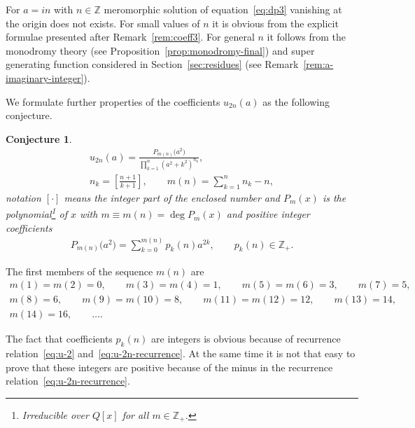 \documentclass[pdftex]{sigma}
\numberwithin{equation}{section}
\newtheorem{Conjecture}[Theorem]{Conjecture}
\begin{document}
\begin{Remark}\label{rem:a-imaginary-integer-final}
For $a=in$ with $n\in\mathbb Z$ meromorphic solution of equation~\eqref{eq:dp3} vanishing at the origin does not
exists. For small values of $n$ it is obvious from the explicit formulae presented after Remark~\ref{rem:coeff3}.
For general $n$ it follows from the monodromy theory (see Proposition~\ref{prop:monodromy-final}) and super
generating function considered in Section~\ref{sec:residues} (see Remark~\ref{rem:a-imaginary-integer}).
\end{Remark}

We formulate further properties of the coefficients $u_{2n}(a)$ as the following conjecture.
\begin{Conjecture}\label{con:expansion-u-main}
\begin{gather}\label{eq:u2ka}
u_{2n}(a)=\frac{P_{m(n)}\big(a^2\big)}{\prod\limits_{k=1}^{n}\left(a^2+k^2\right)^{n_k}},\\
n_k=\left[\frac{n+1}{k+1}\right],\qquad
m(n)=\sum\limits_{k=1}^{n}n_k-n,\label{eq:n-k-m(n)}
\end{gather}
notation $ [\cdot ]$ means the integer part of the enclosed number
and $P_m(x)$ is the polynomial\footnote{Irreducible over $Q[x]$ for all $m\in\mathbb{Z_+}$.} of $x$ with $m\equiv m(n)=\deg P_m(x)$ and positive integer coefficients
\begin{gather}\label{eq:polynom-P}
P_{m(n)}\big(a^2\big)=\sum\limits_{k=0}^{m(n)} p_k(n)a^{2k},\qquad p_k(n)\in\mathbb{Z_+}.
\end{gather}
\end{Conjecture}
\begin{Remark}\label{rem:m(n)}
The first members of the sequence $m(n)$ are
\begin{gather*}
m(1)=m(2)=0,\qquad m(3)=m(4)=1,\qquad m(5)=m(6)=3,\qquad m(7)=5, \\
m(8)=6, \qquad m(9)=m(10)=8, \qquad m(11)=m(12)=12, \qquad m(13)=14, \\
m(14)=16,\qquad\ldots.
\end{gather*}
\end{Remark}

\begin{Remark}\label{rem:coeff-numer-conjecture}
The fact that coefficients $p_k(n)$ are integers is obvious because of recurrence relation~\eqref{eq:u-2} and~\eqref{eq:u-2n-recurrence}. At the same time it is not that easy to prove that these integers are positive because of the minus in the recurrence relation~\eqref{eq:u-2n-recurrence}.
\end{Remark}
\end{document}
